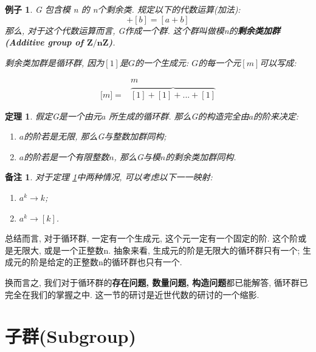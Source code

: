 \documentclass[utf8]{ctexbook}
\newtheorem{theorem}{定理}[section]
\newtheorem{memo}{备注}[section]
\newtheorem{example}{例子}[section]
\begin{document}
\begin{example}\label{example_additive_group_Z_nZ}
G 包含模 n 的 n个剩余类. 规定以下的代数运算(加法):
\begin{equation}
[a] + [b] = [a+b] \nonumber
\end{equation}
那么, 对于这个代数运算而言, G作成一个群. 这个群叫做模n的\textbf{剩余类加群(Additive group of $\mathbf{ Z/nZ}$)}.

剩余类加群是循环群, 因为$ [1] $是$G$的一个生成元: $G$的每一个元$ [m] $可以写成:

\begin{equation}\nonumber
\begin{array}{cc}
 & m \\ 
\lbrack m \rbrack = & \overbrace{[1] + [1] + ... + [1]} 
\end{array}
\end{equation}
\end{example}

\begin{theorem}\label{thm_cyclic_group}
假定G是一个由元$a$ 所生成的循环群. 那么G的构造完全由$a$的阶来决定:
\begin{enumerate}
\item{$a$的阶若是无限, 那么G与整数加群同构;}
\item{$a$的阶若是一个有限整数$n$, 那么G与模$n$的剩余类加群同构.}
\end{enumerate}
\end{theorem}

\begin{memo}
对于定理 \ref{thm_cyclic_group}中两种情况, 可以考虑以下一一映射:
\begin{enumerate}
\item{$a^k \longrightarrow k$;}
\item{$a^k \longrightarrow [ k ]$.}
\end{enumerate}
\end{memo}

总结而言, 对于循环群, 一定有一个生成元, 这个元一定有一个固定的阶. 这个阶或是无限大, 或是一个正整数n. 抽象来看, 生成元的阶是无限大的循环群只有一个; 生成元的阶是给定的正整数n的循环群也只有一个.

换而言之, 我们对于循环群的\textbf{存在问题, 数量问题, 构造问题}都已能解答, 循环群已完全在我们的掌握之中. 这一节的研讨是近世代数的研讨的一个缩影.

\section{子群(Subgroup)}
\end{document}
